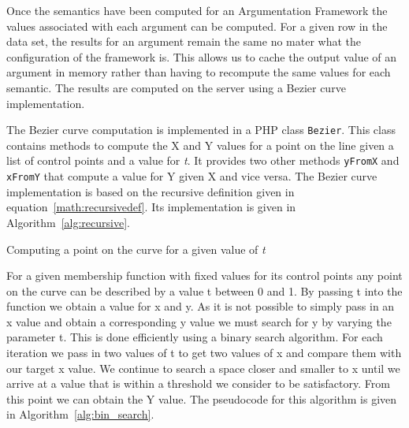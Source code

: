 Once the semantics have been computed for an Argumentation Framework the values associated with each argument can be computed. For a given row in the data set, the results for an argument remain the same no mater what the configuration of the framework is. This allows us to cache the output value of an argument in memory rather than having to recompute the same values for each semantic. The results are computed on the server using a Bezier curve implementation. 

The Bezier curve computation is implemented in a PHP class \lstinline{Bezier}. This class contains methods to compute the X and Y values for a point on the line given a list of control points and a value for \textit{t}. It provides two other methods \lstinline{yFromX} and \lstinline{xFromY} that compute a value for Y given X and vice versa. The Bezier curve implementation is based on the recursive definition given in equation~\ref{math:recursivedef}. Its implementation is given in Algorithm~\ref{alg:recursive}.

\begin{algorithm}[H]
\SetAlgoLined
{}
\caption{Computing a point on the curve for a given value of \textit{t}}
\label{alg:recursive}
\end{algorithm}

For a given membership function with fixed values for its control points any point on the curve can be described by a value t between 0 and 1. By passing t into the function we obtain a value for x and y. As it is not possible to simply pass in an x value and obtain a corresponding y value we must search for y by varying the parameter t. This is done efficiently using a binary search algorithm. For each iteration we pass in two values of t to get two values of x and compare them with our target x value. We continue to search a space closer and smaller to x until we arrive at a value that is within a threshold we consider to be satisfactory. From this point we can obtain the Y value. The pseudocode for this algorithm is given in Algorithm~\ref{alg:bin_search}.

